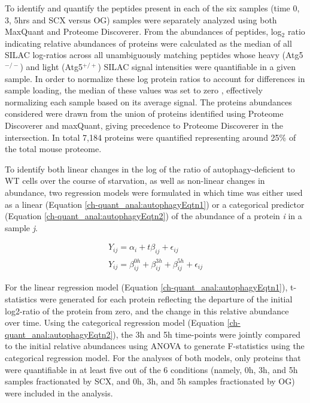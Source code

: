  To identify and quantify the peptides present in each of the six samples (time 0, 3, 5hrs and SCX versus OG) samples were separately analyzed using both MaxQuant and Proteome Discoverer. From the abundances of peptides, log$_{2}$ ratio indicating relative abundances of proteins were calculated as the median of all SILAC log-ratios across all unambiguously matching peptides whose heavy (Atg5$^{-/-}$) and light (Atg5$^{+/+}$) SILAC signal intensities were quantifiable in a given sample. In order to normalize these log protein ratios to account for differences in sample loading, the median of these values was set to zero \cite{Cox:2008ir}, effectively normalizing each sample based on its average signal. The proteins abundances considered were drawn from the union of proteins identified using Proteome Discoverer and maxQuant, giving precedence to Proteome Discoverer in the intersection. In total 7,184 proteins were quantified representing around 25$\%$ of the total mouse proteome.
 
To identify both linear changes in the log of the ratio of autophagy-deficient to WT cells over the course of starvation, as well as non-linear changes in abundance, two regression models were formulated in which time was either used as a linear (Equation \ref{ch-quant_anal:autophagyEqtn1}) or a categorical predictor (Equation \ref{ch-quant_anal:autophagyEqtn2}) of the abundance of a protein \textit{i} in a sample \textit{j}.

\begin{align}
Y_{ij} = \alpha_{i} + t\beta_{ij} + \epsilon_{ij} \label{ch-quant_anal:autophagyEqtn1}\\
Y_{ij} = \beta^{0h}_{ij} + \beta^{3h}_{ij} + \beta^{5h}_{ij} + \epsilon_{ij} \label{ch-quant_anal:autophagyEqtn2}
\end{align}

For the linear regression model (Equation \ref{ch-quant_anal:autophagyEqtn1}), t-statistics were generated for each protein reflecting the departure of the initial log2-ratio of the protein from zero, and the change in this relative abundance over time. Using the categorical regression model (Equation \ref{ch-quant_anal:autophagyEqtn2}), the 3h and 5h time-points were jointly compared to the initial relative abundances using ANOVA to generate F-statistics using the categorical regression model. For the analyses of both models, only proteins that were quantifiable in at least five out of the 6 conditions (namely, 0h, 3h, and 5h samples fractionated by SCX, and 0h, 3h, and 5h samples fractionated by OG) were included in the analysis. 

